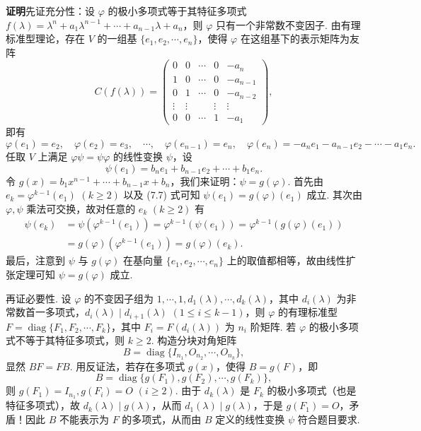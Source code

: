 \documentclass[UTF8, 12pt, fontset=fandol, oneside]{ctexart}
\begin{document}
\noindent\textbf{证明}\quad 先证充分性：设 $\varphi$ 的极小多项式等于其特征多项式 $f(\lambda)=\lambda^n+a_1\lambda^{n-1}+\cdots+a_{n-1}\lambda+a_n$，则 $\varphi$ 只有一个非常数不变因子. 由有理标准型理论，存在 $V$ 的一组基 $\{e_1,e_2,\cdots,e_n\}$，使得 $\varphi$ 在这组基下的表示矩阵为友阵
\[
C(f(\lambda))=
\left(\begin{array}{ccccc}
0 & 0 & \cdots & 0 & -a_n\\
1 & 0 & \cdots & 0 & -a_{n-1}\\
0 & 1 & \cdots & 0 & -a_{n-2}\\
\vdots & \vdots &        & \vdots & \vdots\\
0 & 0 & \cdots & 1 & -a_1
\end{array}\right),
\]
即有
\[
\varphi(e_1)=e_2,\quad \varphi(e_2)=e_3,\quad\cdots,\quad
\varphi(e_{n-1})=e_n,\quad \varphi(e_n)=-a_ne_1-a_{n-1}e_2-\cdots-a_1e_n.
\]
任取 $V$ 上满足 $\varphi\psi=\psi\varphi$ 的线性变换 $\psi$，设
\begin{equation}
\psi(e_1)=b_ne_1+b_{n-1}e_2+\cdots+b_1e_n.
\tag{7.7}
\end{equation}
令 $g(x)=b_1x^{n-1}+\cdots+b_{n-1}x+b_n$，我们来证明：$\psi=g(\varphi)$. 首先由 $e_k=\varphi^{k-1}(e_1)$ $(k\ge 2)$ 以及 (7.7) 式可知 $\psi(e_1)=g(\varphi)(e_1)$ 成立. 其次由 $\varphi,\psi$ 乘法可交换，故对任意的 $e_k$ $(k\ge 2)$ 有
\[
\begin{aligned}
\psi(e_k)
&=\psi(\varphi^{k-1}(e_1))=\varphi^{k-1}(\psi(e_1))
=\varphi^{k-1}(g(\varphi)(e_1))\\
&=g(\varphi)(\varphi^{k-1}(e_1))=g(\varphi)(e_k).
\end{aligned}
\]
最后，注意到 $\psi$ 与 $g(\varphi)$ 在基向量 $\{e_1,e_2,\cdots,e_n\}$ 上的取值都相等，故由线性扩张定理可知 $\psi=g(\varphi)$ 成立.

再证必要性. 设 $\varphi$ 的不变因子组为 $1,\cdots,1,d_1(\lambda),\cdots,d_k(\lambda)$，其中 $d_i(\lambda)$ 为非常数首一多项式，$d_i(\lambda)\mid d_{i+1}(\lambda)$ $(1\le i\le k-1)$，则 $\varphi$ 的有理标准型 $F=\operatorname{diag}\{F_1,F_2,\cdots,F_k\}$，其中 $F_i=F(d_i(\lambda))$ 为 $n_i$ 阶矩阵. 若 $\varphi$ 的极小多项式不等于其特征多项式，则 $k\ge 2$. 构造分块对角矩阵
\[
B=\operatorname{diag}\{I_{n_1},O_{n_2},\cdots,O_{n_k}\},
\]
显然 $BF=FB$. 用反证法，若存在多项式 $g(x)$，使得 $B=g(F)$，即
\[
B=\operatorname{diag}\{g(F_1),g(F_2),\cdots,g(F_k)\},
\]
则 $g(F_1)=I_{n_1},g(F_i)=O$ $(i\ge 2)$. 由于 $d_k(\lambda)$ 是 $F_k$ 的极小多项式（也是特征多项式），故 $d_k(\lambda)\mid g(\lambda)$，从而 $d_1(\lambda)\mid g(\lambda)$，于是 $g(F_1)=O$，矛盾！因此 $B$ 不能表示为 $F$ 的多项式，从而由 $B$ 定义的线性变换 $\psi$ 符合题目要求.
\end{document}
